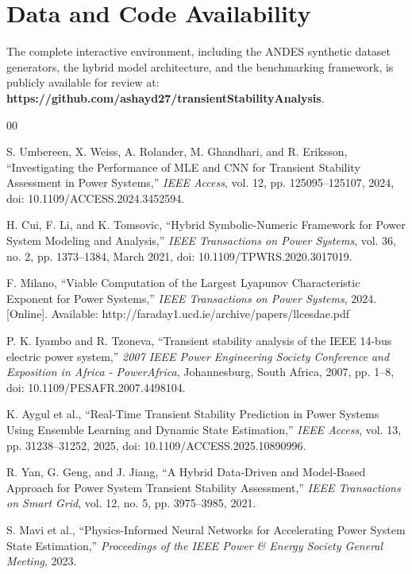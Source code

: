 \documentclass[conference]{IEEEtran}
\begin{document}
\section*{Data and Code Availability}
The complete interactive environment, including the ANDES synthetic dataset generators, the hybrid model architecture, and the benchmarking framework, is publicly available for review at: \textbf{https://github.com/ashayd27/transientStabilityAnalysis}.

\begin{thebibliography}{00}

S. Umbereen, X. Weiss, A. Rolander, M. Ghandhari, and R. Eriksson, ``Investigating the Performance of MLE and CNN for Transient Stability Assessment in Power Systems,'' \textit{IEEE Access}, vol. 12, pp. 125095--125107, 2024, doi: 10.1109/ACCESS.2024.3452594.

H. Cui, F. Li, and K. Tomsovic, ``Hybrid Symbolic-Numeric Framework for Power System Modeling and Analysis,'' \textit{IEEE Transactions on Power Systems}, vol. 36, no. 2, pp. 1373--1384, March 2021, doi: 10.1109/TPWRS.2020.3017019.

F. Milano, ``Viable Computation of the Largest Lyapunov Characteristic Exponent for Power Systems,'' \textit{IEEE Transactions on Power Systems}, 2024. [Online]. Available: http://faraday1.ucd.ie/archive/papers/llcesdae.pdf

P. K. Iyambo and R. Tzoneva, ``Transient stability analysis of the IEEE 14-bus electric power system,'' \textit{2007 IEEE Power Engineering Society Conference and Exposition in Africa - PowerAfrica}, Johannesburg, South Africa, 2007, pp. 1--8, doi: 10.1109/PESAFR.2007.4498104.

K. Aygul et al., ``Real-Time Transient Stability Prediction in Power Systems Using Ensemble Learning and Dynamic State Estimation,'' \textit{IEEE Access}, vol. 13, pp. 31238--31252, 2025, doi: 10.1109/ACCESS.2025.10890996.

R. Yan, G. Geng, and J. Jiang, ``A Hybrid Data-Driven and Model-Based Approach for Power System Transient Stability Assessment,'' \textit{IEEE Transactions on Smart Grid}, vol. 12, no. 5, pp. 3975--3985, 2021.

S. Mavi et al., ``Physics-Informed Neural Networks for Accelerating Power System State Estimation,'' \textit{Proceedings of the IEEE Power \& Energy Society General Meeting}, 2023.

\end{thebibliography}
\end{document}
